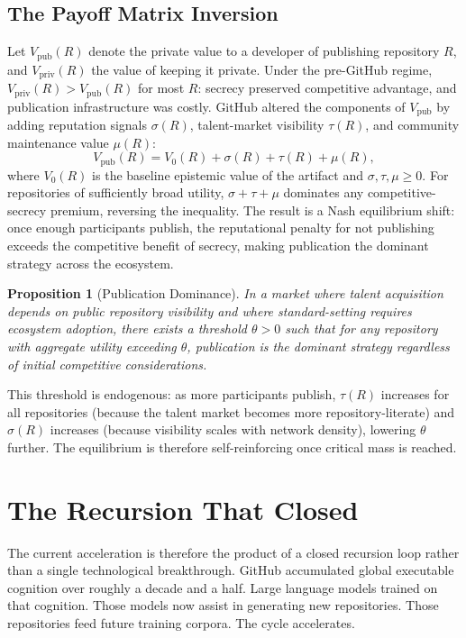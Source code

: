 \documentclass[11pt]{article}
\newtheorem{proposition}[theorem]{Proposition}
\begin{document}
\subsection*{The Payoff Matrix Inversion}

Let $V_\mathrm{pub}(R)$ denote the private value to a developer of publishing
repository $R$, and $V_\mathrm{priv}(R)$ the value of keeping it private.
Under the pre-GitHub regime, $V_\mathrm{priv}(R) > V_\mathrm{pub}(R)$ for
most $R$: secrecy preserved competitive advantage, and publication infrastructure
was costly. GitHub altered the components of $V_\mathrm{pub}$ by adding
reputation signals $\sigma(R)$, talent-market visibility $\tau(R)$, and
community maintenance value $\mu(R)$:
\[
V_\mathrm{pub}(R) = V_0(R) + \sigma(R) + \tau(R) + \mu(R),
\]
where $V_0(R)$ is the baseline epistemic value of the artifact and $\sigma,
\tau, \mu \geq 0$. For repositories of sufficiently broad utility,
$\sigma + \tau + \mu$ dominates any competitive-secrecy premium, reversing the
inequality. The result is a Nash equilibrium shift: once enough participants
publish, the reputational penalty for not publishing exceeds the competitive
benefit of secrecy, making publication the dominant strategy across the
ecosystem.

\begin{proposition}[Publication Dominance]
In a market where talent acquisition depends on public repository visibility and
where standard-setting requires ecosystem adoption, there exists a threshold
$\theta > 0$ such that for any repository with aggregate utility exceeding
$\theta$, publication is the dominant strategy regardless of initial competitive
considerations.
\end{proposition}

This threshold is endogenous: as more participants publish, $\tau(R)$ increases
for all repositories (because the talent market becomes more repository-literate)
and $\sigma(R)$ increases (because visibility scales with network density),
lowering $\theta$ further. The equilibrium is therefore self-reinforcing once
critical mass is reached.

\section{The Recursion That Closed}

The current acceleration is therefore the product of a closed recursion loop
rather than a single technological breakthrough. GitHub accumulated global
executable cognition over roughly a decade and a half. Large language models
trained on that cognition. Those models now assist in generating new
repositories. Those repositories feed future training corpora. The cycle
accelerates.
\end{document}
